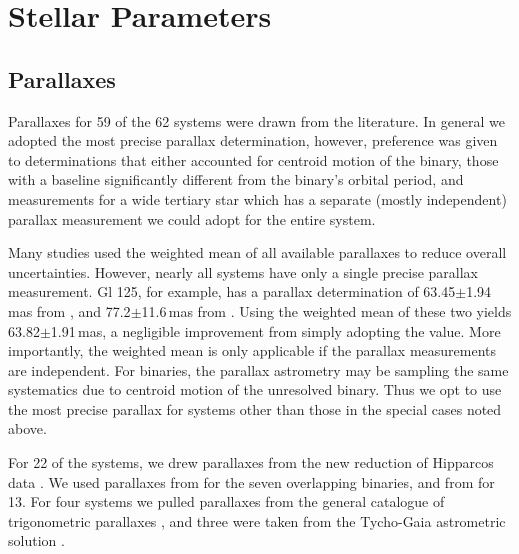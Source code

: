 \documentclass[twocolumn]{aastex62}
\begin{document}
\section{Stellar Parameters}\label{sec:params}

\subsection{Parallaxes}\label{sec:plx}

Parallaxes for 59 of the 62 systems were drawn from the literature. In general we adopted the most precise parallax determination, however, preference was given to determinations that either accounted for centroid motion of the binary, those with a baseline significantly different from the binary's orbital period, and measurements for a wide tertiary star which has a separate (mostly independent) parallax measurement we could adopt for the entire system. 

Many studies used the weighted mean of all available parallaxes \citep[e.g.,][]{Winters2015} to reduce overall uncertainties. However, nearly all systems have only a single precise parallax measurement. Gl 125, for example, has a parallax determination of 63.45$\pm$1.94\,mas from \citet{van-Leeuwen:2007yq}, and 77.2$\pm$11.6\,mas from \citet{van-Altena1995}. Using the weighted mean of these two yields 63.82$\pm$1.91\,mas, a negligible improvement from simply adopting the \citet{van-Leeuwen:2007yq} value. More importantly, the weighted mean is only applicable if the parallax measurements are independent. For binaries, the parallax astrometry may be sampling the same systematics due to centroid motion of the unresolved binary. Thus we opt to use the most precise parallax for systems other than those in the special cases noted above.  

For 22 of the systems, we drew parallaxes from the new reduction of Hipparcos data \citep{van-Leeuwen:2007yq}. We used parallaxes from \citet{Dupuy2017} for the seven overlapping binaries, and from \citet{Benedict2016} for 13. For four systems we pulled parallaxes from the general catalogue of trigonometric parallaxes \citep{van-Altena1995}, and three were taken from the Tycho-Gaia astrometric solution \citep[TGAS or Gaia DR1,][]{gaiadr1}.
\end{document}
